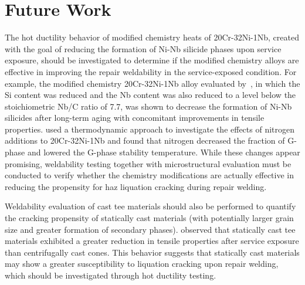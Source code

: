 \chapter{Future Work} \label{ch:future-work}
The hot ductility behavior of modified chemistry heats of 20Cr-32Ni-1Nb, created with the goal of reducing the formation of Ni-Nb silicide phases upon service exposure, should be investigated to determine if the modified chemistry alloys are effective in improving the repair weldability in the service-exposed condition. For example, the modified chemistry 20Cr-32Ni-1Nb alloy evaluated by~\citet{hoffman_cast_2003}, in which the Si content was reduced and the Nb content was also reduced to a level below the stoichiometric Nb/C ratio of 7.7, was shown to decrease the formation of Ni-Nb silicides after long-term aging with concomitant improvements in tensile properties. \citet{dewar_correlation_2013} used a thermodynamic approach to investigate the effects of nitrogen additions to 20Cr-32Ni-1Nb and found that nitrogen decreased the fraction of G-phase and lowered the G-phase stability temperature. While these changes appear promising, weldability testing together with microstructural evaluation must be conducted to verify whether the chemistry modifications are actually effective in reducing the propensity for \gls{haz} liquation cracking during repair welding.

Weldability evaluation of cast tee materials should also be performed to quantify the cracking propensity of statically cast materials (with potentially larger grain size and greater formation of secondary phases). \citet{hoffman_high_2000-1} observed that statically cast tee materials exhibited a greater reduction in tensile properties after service exposure than centrifugally cast cones. This behavior suggests that statically cast materials may show a greater susceptibility to liquation cracking upon repair welding, which should be investigated through hot ductility testing.


